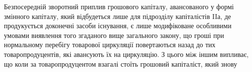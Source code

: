 Безпосередній зворотний приплив грошового капіталу, авансованого у
формі змінного капіталу, який відбудеться лише для підрозділу капіталістів
II$а$, де продукується доконечні засоби існування, є лише модифіковане
особливими умовами виявлення того згаданого вище
загального закону, що гроші при нормальному перебігу товарової
циркуляції повертаються назад до тих товаропродуцентів, які авансують
їх на циркуляцію. З цього між іншим випливає, що коли за
товаропродуцентом взагалі стоїть грошовий капіталіст, який знову
\parbreak{}  %
